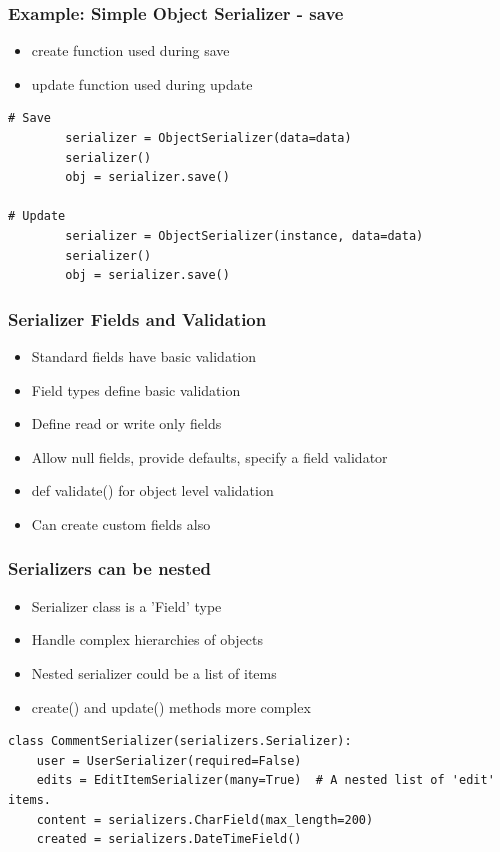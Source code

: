 \documentclass{beamer}
\begin{document}
\begin{frame}[fragile]

  \frametitle{Example: Simple Object Serializer - save}

\begin{itemize}
	\item create function used during save
	\item update function used during update
\end{itemize}

\begin{lstlisting}
# Save
        serializer = ObjectSerializer(data=data)
        serializer()
        obj = serializer.save()
        
# Update
        serializer = ObjectSerializer(instance, data=data)
        serializer()
        obj = serializer.save()        
\end{lstlisting}

\end{frame}

\begin{frame}[fragile]

  \frametitle{Serializer Fields and Validation}

\begin{itemize}
	\item Standard fields have basic validation
	\item Field types define basic validation
	\item Define read or write only fields
	\item Allow null fields, provide defaults, specify a field validator
	\item def validate() for object level validation
	\item Can create custom fields also
\end{itemize}


\end{frame}

\begin{frame}[fragile]

  \frametitle{Serializers can be nested}

\begin{itemize}
	\item Serializer class is a 'Field' type
	\item Handle complex hierarchies of objects
	\item Nested serializer could be a list of items
	\item create() and update() methods more complex
	
\end{itemize}

\begin{lstlisting}
class CommentSerializer(serializers.Serializer):
    user = UserSerializer(required=False)
    edits = EditItemSerializer(many=True)  # A nested list of 'edit' items.
    content = serializers.CharField(max_length=200)
    created = serializers.DateTimeField()
\end{lstlisting}

\end{frame}
\end{document}
